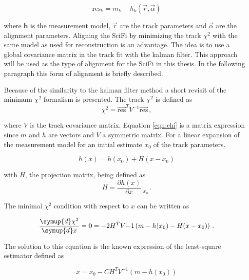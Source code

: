 \begin{equation}
  \text{res}_k = m_k - h_k(\vec{r},\vec{\alpha})
\end{equation}

where $\symbf{h}$ is the measurement model, $\vec{r}$ are the track parameters and $\vec{\alpha}$ are the alignment parameters.
Aligning the SciFi by minimizing the track $\chi^2$ with the same model as used for reconstruction is an advantage. The idea is to use a global covariance matrix in the track fit with the kalman filter.
This approach will be used as the type of alignment for the SciFi in this thesis.
In the following paragraph this form of alignment is briefly described\cite{HULSBERGEN1}.

Because of the similarity to the kalman filter method a short revisit of the minimum $\chi^2$ formalism is presented.
The track $\chi^2$ is defined as
\begin{equation}
  \chi^2 = \vec{\text{res}}^T V^{-1} \vec{\text{res}}\,,
  \label{eqn:chi}
\end{equation}

where $V$ is the track covariance matrix. Equation \eqref{eqn:chi} is a matrix expression since $m$ and $h$ are vectors and $V$ a symmetric matrix. For a linear expansion of the measurement model for an initial estimate $x_0$ of the track parameters.

\begin{equation*}
    h(x) = h(x_0) + H(x - x_0)
\end{equation*}

with $H$, the projection matrix, being defined as
\begin{equation*}
    H = \frac{\partial h(x)}{\partial x}\vert_{x_0}\,.
\end{equation*}

The minimal $\chi^2$ condition with respect to $x$ can be written as

\begin{equation*}
    \frac{\symup{d}\chi^2}{\symup{d}x} = 0
    = -2 H^T V{-1} \left( m - h(x_0) - H(x - x_0) \right)\,.
\end{equation*}

The solution to this equation is the known expression of the least-square estimator defined as

\begin{equation}
    x = x_0 - C H^T V^{-1} \left( m - h(x_0) \right)
    \label{eqn:lsq}
\end{equation}

